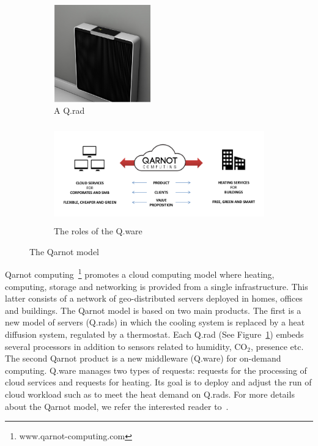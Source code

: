 \documentclass[10pt, conference, compsocconf]{IEEEtran}
\begin{document}
	\begin{figure}[htbp]
          \begin{subfigure}[b]{0.4\textwidth}
            \centering
            \includegraphics[width=4.2cm,height=4.2cm]{./Figures/rad.png}
            \caption{\scriptsize A Q.rad }
          \end{subfigure}
          \begin{subfigure}[b]{0.4\textwidth}
            \centering
            \includegraphics[width=10.7cm,height=4.2cm]{./Figures/model.png}
            \caption{\scriptsize The roles of the Q.ware }
          \end{subfigure}
	\caption{The Qarnot model}
	\label{fig:digital}
	\end{figure}


Qarnot computing~\footnote{www.qarnot-computing.com} promotes a cloud computing model where heating, computing, 
storage and networking is provided from a 
single infrastructure. This latter consists of a network of geo-distributed servers deployed in homes, offices and buildings. 
The Qarnot model is based on two main products. The first is a new model of servers (Q.rads) in which the cooling system is replaced by a 
heat diffusion system, regulated by a thermostat. Each Q.rad (See Figure~\ref{fig:digital}) embeds several processors in addition to sensors 
related to humidity, $\mathrm{CO_2}$, presence etc. The second Qarnot product is a new middleware (Q.ware) for on-demand computing. Q.ware manages 
two types of requests: requests for the processing of cloud services  and requests for heating. Its goal is to deploy and 
adjust the run of cloud workload such as to meet the heat demand on Q.rads. For more details about the Qarnot model, we refer the interested 
reader to~\cite{DBLP:conf/europar/Ngoko16}. 
\end{document}
